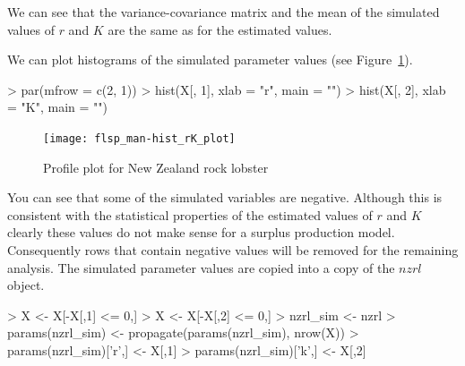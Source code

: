 \documentclass[a4paper]{article}
\begin{document}
We can see that the variance-covariance matrix and the mean of the simulated values of $r$ and $K$ are the same as for the estimated values.

We can plot histograms of the simulated parameter values (see Figure~\ref{fig:hist_rK_plot}).

\begin{center}
\begin{minipage}[H]{0.95\textwidth}%
\begin{shaded}%
\begin{Schunk}
\begin{Sinput}
> par(mfrow = c(2, 1))
> hist(X[, 1], xlab = "r", main = "")
> hist(X[, 2], xlab = "K", main = "")
\end{Sinput}
\end{Schunk}
\end{shaded}%
\end{minipage}
\end{center}

\begin{figure}
\begin{center}
\texttt{[image: flsp\_man-hist\_rK\_plot]}
\end{center}
\caption{Profile plot for New Zealand rock lobster}
\label{fig:hist_rK_plot}
\end{figure}

You can see that some of the simulated variables are negative. Although this is consistent with the statistical properties of the estimated values of $r$ and $K$ clearly these values do not make sense for a surplus production model. Consequently rows that contain negative values will be removed for the remaining analysis. The simulated parameter values are copied into a copy of the $nzrl$ object.


\begin{center}
\begin{minipage}[H]{0.95\textwidth}%
\begin{shaded}%
\begin{Schunk}
\begin{Sinput}
> X <- X[-X[,1] <= 0,]
> X <- X[-X[,2] <= 0,]
> nzrl_sim <- nzrl
> params(nzrl_sim) <- propagate(params(nzrl_sim), nrow(X))
> params(nzrl_sim)['r',] <- X[,1]
> params(nzrl_sim)['k',] <- X[,2]
\end{Sinput}
\end{Schunk}
\end{shaded}%
\end{minipage}
\end{center}
\end{document}

